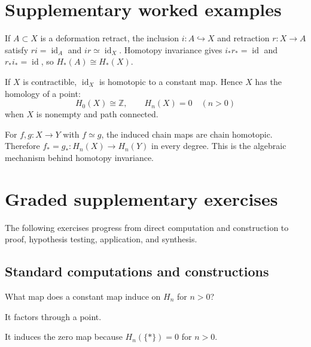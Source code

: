 \section{Supplementary worked examples}
\label{sec:viii20-pedagogy}

\begin{example}\label{ex:viii20-ped-01}
If $A\subset X$ is a deformation retract, the inclusion $i:A\hookrightarrow X$ and retraction $r:X\to A$ satisfy $r i=\operatorname{id}_A$ and $i r\simeq\operatorname{id}_X$. Homotopy invariance gives $i_*r_*=\operatorname{id}$ and $r_*i_*=\operatorname{id}$, so $H_*(A)\cong H_*(X)$.
\end{example}

\begin{example}\label{ex:viii20-ped-02}
If $X$ is contractible, $\operatorname{id}_X$ is homotopic to a constant map. Hence $X$ has the homology of a point:
\[
H_0(X)\cong\mathbb Z,\qquad H_n(X)=0\quad(n>0)
\]
when $X$ is nonempty and path connected.
\end{example}

\begin{example}\label{ex:viii20-ped-03}
For $f,g:X\to Y$ with $f\simeq g$, the induced chain maps are chain homotopic. Therefore $f_*=g_*:H_n(X)\to H_n(Y)$ in every degree. This is the algebraic mechanism behind homotopy invariance.
\end{example}

\section{Graded supplementary exercises}
The following exercises progress from direct computation and construction to proof, hypothesis testing, application, and synthesis.

\subsection*{Standard computations and constructions}

\begin{exercise}\label{exr:viii20-ped-01}
What map does a constant map induce on $H_n$ for $n>0$?
\end{exercise}
\begin{hint}
It factors through a point.
\end{hint}
\begin{solution}
It induces the zero map because $H_n(\{*\})=0$ for $n>0$.
\end{solution}

